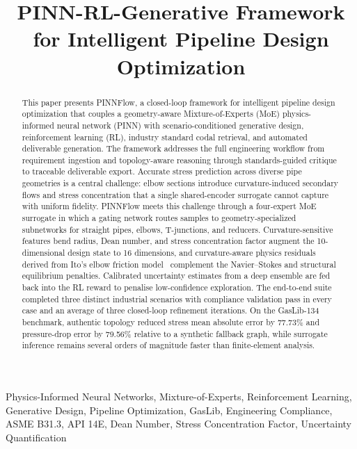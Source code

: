 \documentclass[conference]{IEEEtran}
\title{PINN-RL-Generative Framework for Intelligent Pipeline Design Optimization}
\author{

\IEEEauthorblockN{Kushal Bhargav, Vinod Sampath, Gaurav Sarma, Raghav Sandhu}

\IEEEauthorblockA{\textbf{Team PINNpoint Flow} \\
IEEE IES Generative AI Challenge 2026}

}
\begin{document}
 
\maketitle
 
\begin{abstract}

This paper presents PINNFlow, a closed-loop framework for intelligent pipeline design optimization that couples a geometry-aware Mixture-of-Experts (MoE) physics-informed neural network (PINN) with scenario-conditioned generative design, reinforcement learning (RL), industry standard codal retrieval, and automated deliverable generation. The framework addresses the full engineering workflow from requirement ingestion and topology-aware reasoning through standards-guided critique to traceable deliverable export. Accurate stress prediction across diverse pipe geometries is a central challenge: elbow sections introduce curvature-induced secondary flows and stress concentration that a single shared-encoder surrogate cannot capture with uniform fidelity. PINNFlow meets this challenge through a four-expert MoE surrogate in which a gating network routes samples to geometry-specialized subnetworks for straight pipes, elbows, T-junctions, and reducers. Curvature-sensitive features bend radius, Dean number, and stress concentration factor augment the 10-dimensional design state to 16 dimensions, and curvature-aware physics residuals derived from Ito's elbow friction model~\cite{ito1959} complement the Navier--Stokes and structural equilibrium penalties. Calibrated uncertainty estimates from a deep ensemble are fed back into the RL reward to penalise low-confidence exploration. The end-to-end suite completed three distinct industrial scenarios with compliance validation pass in every case and an average of three closed-loop refinement iterations. On the GasLib-134 benchmark, authentic topology reduced stress mean absolute error by 77.73\% and pressure-drop error by 79.56\% relative to a synthetic fallback graph, while surrogate inference remains several orders of magnitude faster than finite-element analysis.

\end{abstract}
 
\begin{IEEEkeywords}

Physics-Informed Neural Networks, Mixture-of-Experts, Reinforcement Learning, Generative Design, Pipeline Optimization, GasLib, Engineering Compliance, ASME B31.3, API 14E, Dean Number, Stress Concentration Factor, Uncertainty Quantification

\end{IEEEkeywords}
 
\end{document}
